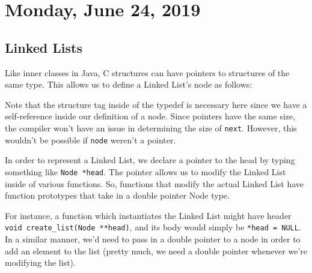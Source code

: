 \section{Monday, June 24, 2019}

\subsection{Linked Lists}
Like inner classes in Java, C structures can have pointers to structures of the same type. This allows us to define a Linked List's node as follows:


\lstset{
caption=Linked List Node}
\begin{center}
\label{Command Line Parameters}
\end{center}


Note that the structure tag inside of the typedef is necessary here since we have a self-reference inside our definition of a node. Since pointers have the same size, the compiler won't have an issue in determining the size of \verb!next!. However, this wouldn't be possible if \verb!node! weren't a pointer.

In order to represent a Linked List, we declare a pointer to the head by typing something like \verb!Node *head!. The pointer allows us to modify the Linked List inside of various functions. So, functions that modify the actual Linked List have function prototypes that take in a double pointer Node type. 


For instance, a function which instantiates the Linked List might have header \verb!void create_list(Node **head)!, and its body would simply be \verb!*head = NULL!. In a similar manner, we'd need to pass in a double pointer to a node in order to add an element to the list (pretty much, we need a double pointer whenever we're modifying the list). 






